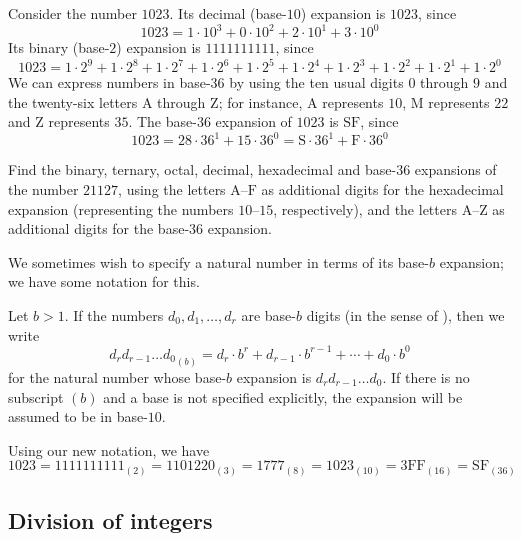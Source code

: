 \begin{example}
Consider the number $1023$. Its decimal (base-$10$) expansion is $1023$, since
\[ 1023 = 1 \cdot 10^3 + 0 \cdot 10^2 + 2 \cdot 10^1 + 3 \cdot 10^0 \]
Its binary (base-$2$) expansion is $1111111111$, since
\[ 1023 = 1 \cdot 2^9 + 1 \cdot 2^8 + 1 \cdot 2^7 + 1 \cdot 2^6 + 1 \cdot 2^5 + 1 \cdot 2^4 + 1 \cdot 2^3 + 1 \cdot 2^2 + 1 \cdot 2^1 + 1 \cdot 2^0 \]
We can express numbers in base-$36$ by using the ten usual digits $0$ through $9$ and the twenty-six letters $\mathrm{A}$ through $\mathrm{Z}$; for instance, $\mathrm{A}$ represents $10$, $\mathrm{M}$ represents $22$ and $\mathrm{Z}$ represents $35$. The base-$36$ expansion of $1023$ is $\mathrm{SF}$, since
\[ 1023 = 28 \cdot 36^1 + 15 \cdot 36^0 = \mathrm{S} \cdot 36^1 + \mathrm{F} \cdot 36^0 \]
\end{example}

\begin{exercise}
Find the binary, ternary, octal, decimal, hexadecimal and base-$36$ expansions of the number $21127$, using the letters $\mathrm{A}$--$\mathrm{F}$ as additional digits for the hexadecimal expansion (representing the numbers $10$--$15$, respectively), and the letters $\mathrm{A}$--$\mathrm{Z}$ as additional digits for the base-$36$ expansion.
\end{exercise}

We sometimes wish to specify a natural number in terms of its base-$b$ expansion; we have some notation for this.

\begin{notation}
Let $b>1$. If the numbers $d_0,d_1,\dots,d_r$ are base-$b$ digits (in the sense of ), then we write
\[ {d_rd_{r-1} \dots d_0}_{(b)} = d_r \cdot b^r + d_{r-1} \cdot b^{r-1} + \cdots + d_0 \cdot b^0 \]
for the natural number whose base-$b$ expansion is $d_rd_{r-1} \dots d_0$. If there is no subscript $(b)$ and a base is not specified explicitly, the expansion will be assumed to be in base-$10$.
\end{notation}

\begin{example}
Using our new notation, we have
\[ 1023 = 1111111111_{(2)} = 1101220_{(3)} = 1777_{(8)} = 1023_{(10)} = 3\mathrm{FF}_{(16)} = \mathrm{SF}_{(36)} \]
\end{example}

\subsection*{Division of integers}
\label{pGettingStartedDivision}


